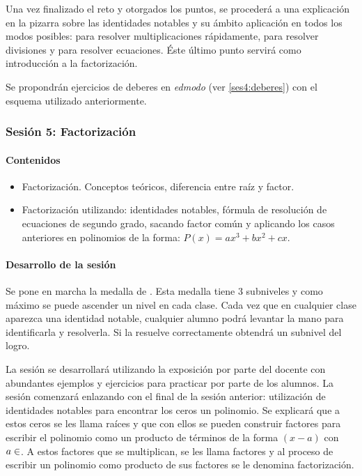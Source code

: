 Una vez finalizado el reto y otorgados los puntos, se procederá a una explicación en la pizarra sobre las identidades notables y su ámbito aplicación en todos los modos posibles:
%
para resolver multiplicaciones rápidamente, para resolver divisiones y para resolver ecuaciones.
%
Éste último punto servirá como introducción a la factorización.


Se propondrán ejercicios de deberes en \textit{edmodo} (ver \ref{ses4:deberes}) con el esquema utilizado anteriormente.


\subsubsection{Sesión 5: Factorización}

\paragraph{Contenidos}
\begin{itemize}
	\item Factorización. Conceptos teóricos, diferencia entre raíz y factor.
	\item Factorización utilizando: identidades notables, fórmula de resolución de ecuaciones de segundo grado, sacando factor común y aplicando los casos anteriores en polinomios de la forma: $P(x) = ax^3+bx^2+cx$.
\end{itemize}

\paragraph{Desarrollo de la sesión}

Se pone en marcha la medalla de .
%
Esta medalla tiene 3 subniveles y como máximo se puede ascender un nivel en cada clase.
%
Cada vez que en cualquier clase aparezca una identidad notable, cualquier alumno podrá levantar la mano para identificarla y resolverla. 
%
Si la resuelve correctamente obtendrá un subnivel del logro.

La sesión se desarrollará utilizando la exposición por parte del docente con abundantes ejemplos y ejercicios para practicar por parte de los alumnos.
%
La sesión comenzará enlazando con el final de la sesión anterior: utilización de identidades notables para encontrar los ceros un polinomio.
%
Se explicará que a estos ceros se les llama raíces y que con ellos se pueden construir factores para escribir el polinomio como un producto de términos de la forma $(x-a)$ con $a\in\real$.
%
A estos factores que se multiplican, se les llama factores y al proceso de escribir un polinomio como producto de sus factores se le denomina factorización.


